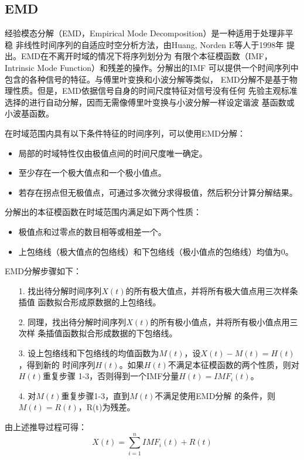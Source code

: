 \documentclass[AutoFakeBold]{LZUThesis}
\begin{document}
\subsection{EMD}
经验模态分解（EMD，Empirical Mode Decomposition）是一种适用于处理非平稳
非线性时间序列的自适应时空分析方法，由Huang, Norden E等人于1998年
提出\cite{huang1998empirical}。EMD在不离开时域的情况下将序列划分为
有限个本征模函数（IMF，Intrinsic Mode Function）和残差的操作。分解出的IMF
可以提供一个时间序列中包含的各种信号的特征。与傅里叶变换和小波分解等类似，
EMD分解不是基于物理性质。但是，EMD依据信号自身的时间尺度特征对信号没有任何
先验主观标准选择的进行自动分解，因而无需像傅里叶变换与小波分解一样设定谐波
基函数或小波基函数。

在时域范围内具有以下条件特征的时间序列，可以使用EMD分解：
\begin{itemize}
\item 局部的时域特性仅由极值点间的时间尺度唯一确定。
\item 至少存在一个极大值点和一个极小值点。
\item 若存在拐点但无极值点，可通过多次微分求得极值，然后积分计算分解结果。
\end{itemize}

分解出的本征模函数在时域范围内满足如下两个性质：
\begin{itemize}
\item 极值点和过零点的数目相等或相差一个。
\item 上包络线（极大值点的包络线）和下包络线（极小值点的包络线）均值为0。
\end{itemize}

EMD分解步骤如下：
\begin{itemize}
\item[1. ] 找出待分解时间序列$X(t)$的所有极大值点，并将所有极大值点用三次样条插值
函数拟合形成原数据的上包络线。
\item[2. ] 同理，找出待分解时间序列$X(t)$的所有极小值点，并将所有极小值点用三次样
条插值函数拟合形成数据的下包络线。
\item[3. ] 设上包络线和下包络线的均值函数为$M(t)$，设$X(t)-M(t)=H(t)$，得到新的
时间序列$H(t)$。如果$H(t)$不满足本征模函数的两个性质，则对$H(t)$重复步骤
1-3，否则得到一个IMF分量$H(t)=IMF_i(t)$。
\item[4. ] 对$M(t)$重复步骤1-3，直到$M(t)$不满足使用EMD分解
的条件，则$M(t)=R(t)$，R(t)为残差。
\end{itemize}

由上述推导过程可得：
$$
X(t)=\displaystyle\sum_{i=1} ^n IMF_i(t) +R(t)
$$
\end{document}
